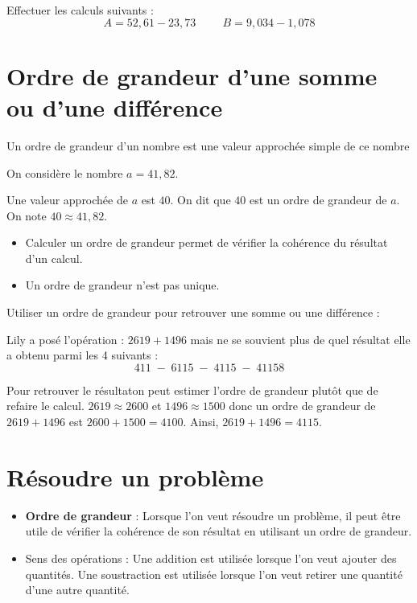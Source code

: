 \documentclass[a4paper,dvipsnames]{article}
\begin{document}
\begin{ExOApp}[]
Effectuer les calculs suivants :
\[A=52,61-23,73
\hspace{1cm}
B=9,034-1,078\]
\end{ExOApp} 

\section{Ordre de grandeur d'une somme ou d'une différence}

\begin{Def}
Un ordre de grandeur d'un nombre est une valeur approchée simple de ce nombre
\end{Def}

\begin{Ex}
On considère le nombre $a=41,82$. 

Une valeur approchée de $a$ est $40$. On dit que $40$ est un ordre de grandeur de $a$. On note $40\approx41,82$.
\end{Ex}

\begin{Rqs}
\begin{itemize}
\item Calculer un ordre de grandeur permet de vérifier la cohérence du résultat d'un calcul.
\item Un ordre de grandeur n'est pas unique.
\end{itemize}
\end{Rqs}

\begin{Mt}
Utiliser un ordre de grandeur pour retrouver une somme ou une différence :

Lily a posé l'opération : $2619+1496$ mais ne se souvient plus de quel résultat elle a obtenu parmi les 4 suivants :
\[411\;-\;6115\;-\;4115\;-\;41158\]

Pour retrouver le résultaton peut estimer l'ordre de grandeur plutôt que de refaire le calcul. $2619\approx2600$ et $1496\approx1500$ donc un ordre de grandeur de $2619+1496$ est $2600+1500=4100$. Ainsi, $2619+1496=4115$.
\end{Mt}

\section{Résoudre un problème}

\begin{Mt}
\begin{itemize}
\item \textbf{Ordre de grandeur} : Lorsque l'on veut résoudre un problème, il peut être utile de vérifier la cohérence de son résultat en utilisant un ordre de grandeur.
\item Sens des opérations : Une addition est utilisée lorsque l'on veut ajouter des quantités. Une soustraction est utilisée lorsque l'on veut retirer une quantité d'une autre quantité.
\end{itemize}
\end{Mt}
\end{document}
